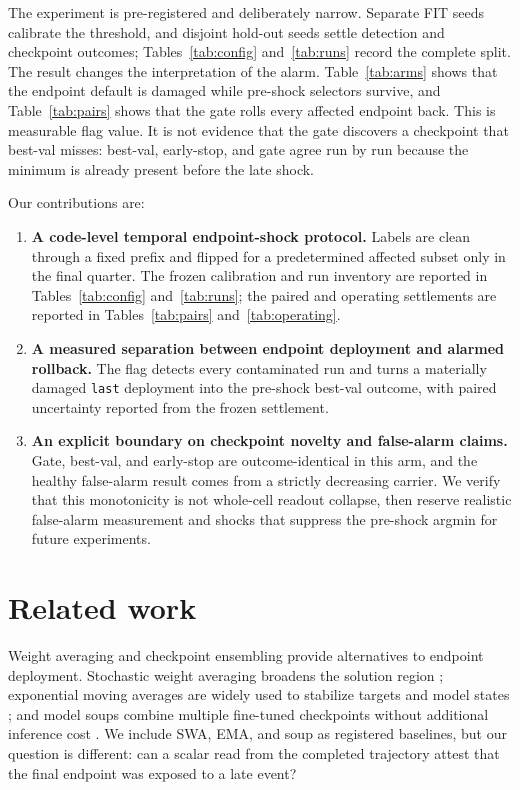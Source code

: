 \documentclass{article} %
\theoremstyle{remark}
\begin{document}
The experiment is pre-registered and deliberately narrow. Separate FIT seeds calibrate the
threshold, and disjoint hold-out seeds settle detection and checkpoint outcomes; Tables~\ref{tab:config}
and~\ref{tab:runs} record the complete split. The result changes the interpretation of the alarm.
Table~\ref{tab:arms} shows that the endpoint default is damaged while pre-shock selectors survive,
and Table~\ref{tab:pairs} shows that the gate rolls every affected endpoint back. This is measurable
flag value. It is not evidence that the gate discovers a checkpoint that best-val misses: best-val,
early-stop, and gate agree run by run because the minimum is already present before the late shock.

Our contributions are:
\begin{enumerate}
\item \textbf{A code-level temporal endpoint-shock protocol.} Labels are clean through a fixed
prefix and flipped for a predetermined affected subset only in the final quarter. The frozen
calibration and run inventory are reported in Tables~\ref{tab:config} and~\ref{tab:runs}; the paired
and operating settlements are reported in Tables~\ref{tab:pairs} and~\ref{tab:operating}.
\item \textbf{A measured separation between endpoint deployment and alarmed rollback.} The flag
detects every contaminated run and turns a materially damaged \texttt{last} deployment into the
pre-shock best-val outcome, with paired uncertainty reported from the frozen settlement.
\item \textbf{An explicit boundary on checkpoint novelty and false-alarm claims.} Gate, best-val,
and early-stop are outcome-identical in this arm, and the healthy false-alarm result comes from a
strictly decreasing carrier. We verify that this monotonicity is not whole-cell readout collapse,
then reserve realistic false-alarm measurement and shocks that suppress the pre-shock argmin for
future experiments.
\end{enumerate}

\section{Related work}
\label{sec:related}

Weight averaging and checkpoint ensembling provide alternatives to endpoint deployment. Stochastic
weight averaging broadens the solution region \citep{swa}; exponential moving averages are widely
used to stabilize targets and model states \citep{ema}; and model soups combine multiple
fine-tuned checkpoints without additional inference cost \citep{wortsditcher2022}. We include
SWA, EMA, and soup as registered baselines, but our question is different: can a scalar read from
the completed trajectory attest that the final endpoint was exposed to a late event?
\end{document}
